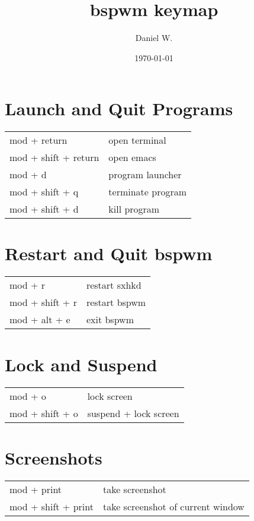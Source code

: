 \documentclass[
    10pt,
    a4paper,
    notitlepage,
    egregdoesnotlikesansseriftitles
]{scrartcl}
\title{bspwm keymap}
\author{Daniel W.}
\date{\today}
\begin{document}
\maketitle

\section{Launch and Quit Programs}
\begin{tabular}{p{4cm}l}
    mod + return            & open terminal                         \\
    mod + shift + return    & open emacs                            \\
    mod + d                 & program launcher                      \\
    mod + shift + q         & terminate program                     \\
    mod + shift + d         & kill program
\end{tabular}

\section{Restart and Quit bspwm}
\begin{tabular}{p{4cm}l}
    mod + r             & restart sxhkd                         \\
    mod + shift + r     & restart bspwm                         \\
    mod + alt + e       & exit bspwm
\end{tabular}

\section{Lock and Suspend}
\begin{tabular}{p{4cm}l}
    mod + o             & lock screen                           \\
    mod + shift + o     & suspend + lock screen
\end{tabular}

\section{Screenshots}
\begin{tabular}{p{4cm}l}
    mod + print         & take screenshot                       \\
    mod + shift + print & take screenshot of current window
\end{tabular}
\end{document}
